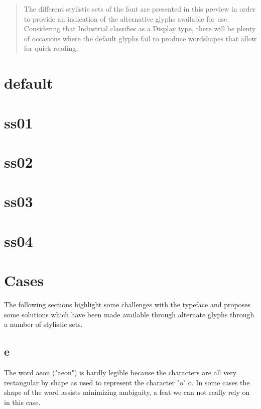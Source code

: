 \documentclass[a4paper]{article}
\begin{document}
\title{}
\author{}
\maketitle
\begin{abstract}
  The different stylistic sets of the font are presented in this preview in order to provide an indication of the alternative glyphs available for use.
  Considering that Industrial classifies as a Display type, there will be plenty of occasions where the default glyphs fail to produce wordshapes that allow for quick reading.
\end{abstract}


\newpage
\section{default}
{\ssdefault }

\newpage
\section{ss01}
{\ssone }

\newpage
\section{ss02}
{\sstwo }

\newpage
\section{ss03}
{\ssthree }

\newpage
\section{ss04}
{\ssfour }


\newpage
\section{Cases}
The following sections highlight some challenges with the typeface and proposes
some solutions which have been made available through alternate glyphs through
a number of stylistic sets.

\subsection{e}
The word {\ssdefault aeon} ("aeon") is hardly legible because the characters
are all very rectangular by shape as used to represent the character "o"
{\ssdefault o}. In some cases the shape of the word assists minimizing
ambiguity, a feat we can not really rely on in this case.
\end{document}
